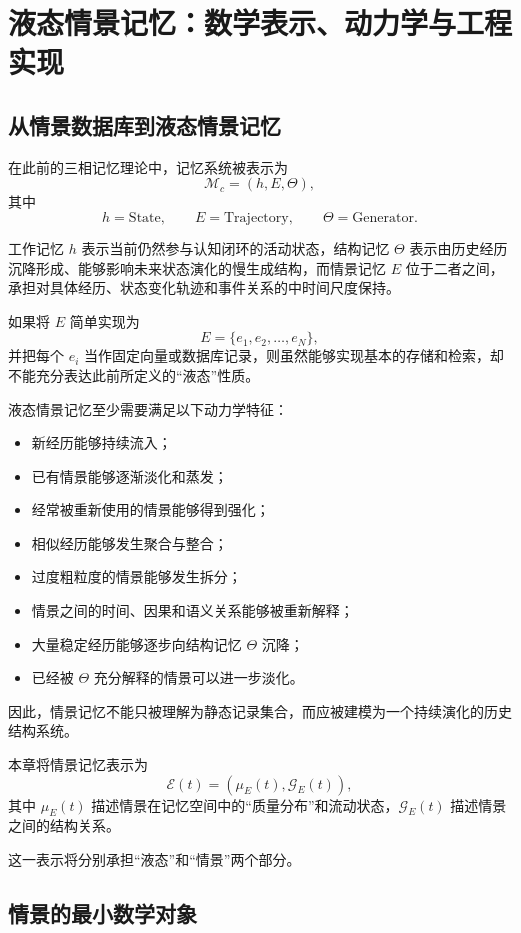 \chapter{液态情景记忆：数学表示、动力学与工程实现}

\section{从情景数据库到液态情景记忆}

在此前的三相记忆理论中，记忆系统被表示为
\[
\mathcal{M}_c=(h,E,\Theta),
\]
其中
\[
h=\mathrm{State},
\qquad
E=\mathrm{Trajectory},
\qquad
\Theta=\mathrm{Generator}.
\]

工作记忆 $h$ 表示当前仍然参与认知闭环的活动状态，结构记忆 $\Theta$ 表示由历史经历沉降形成、能够影响未来状态演化的慢生成结构，而情景记忆 $E$ 位于二者之间，承担对具体经历、状态变化轨迹和事件关系的中时间尺度保持。

如果将 $E$ 简单实现为
\[
E=\{e_1,e_2,\ldots,e_N\},
\]
并把每个 $e_i$ 当作固定向量或数据库记录，则虽然能够实现基本的存储和检索，却不能充分表达此前所定义的“液态”性质。

液态情景记忆至少需要满足以下动力学特征：

\begin{itemize}
    \item 新经历能够持续流入；
    \item 已有情景能够逐渐淡化和蒸发；
    \item 经常被重新使用的情景能够得到强化；
    \item 相似经历能够发生聚合与整合；
    \item 过度粗粒度的情景能够发生拆分；
    \item 情景之间的时间、因果和语义关系能够被重新解释；
    \item 大量稳定经历能够逐步向结构记忆 $\Theta$ 沉降；
    \item 已经被 $\Theta$ 充分解释的情景可以进一步淡化。
\end{itemize}

因此，情景记忆不能只被理解为静态记录集合，而应被建模为一个持续演化的历史结构系统。

本章将情景记忆表示为
\[
\boxed{
\mathcal{E}(t)
=
\left(
\mu_E(t),
\mathcal{G}_E(t)
\right),
}
\]
其中 $\mu_E(t)$ 描述情景在记忆空间中的“质量分布”和流动状态，$\mathcal{G}_E(t)$ 描述情景之间的结构关系。

这一表示将分别承担“液态”和“情景”两个部分。

\section{情景的最小数学对象}

